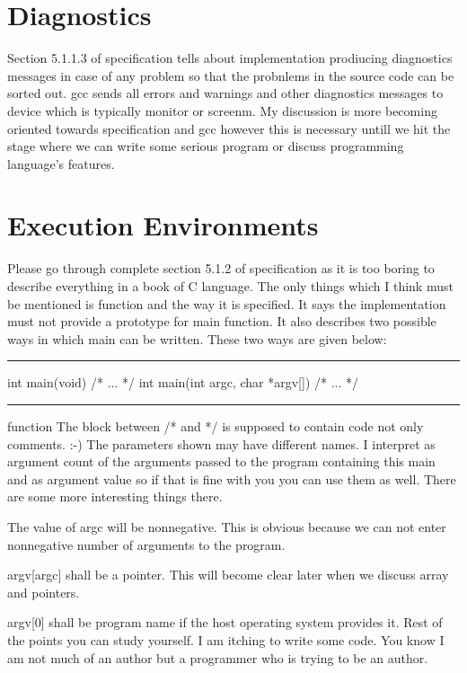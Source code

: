 \section{Diagnostics}
Section 5.1.1.3 of specification tells about implementation prodiucing
diagnostics messages in case of any problem so that the probnlems in
the source code can be sorted out. gcc sends all errors and warnings
and other diagnostics messages to  device which is
typically monitor or screenm. My discussion is more becoming oriented
towards specification and gcc however this is necessary untill we hit
the stage where we can write some serious program or discuss
programming language's features.

\section{Execution Environments}
Please go through complete section 5.1.2 of specification as it is too
boring to describe everything in a book of C language. The only things
which I think must be mentioned is  function and the way it
is specified. It says the implementation must not provide a prototype
for main function. It also describes two possible ways in which main
can be written. These two ways are given below:
\blank[force,1mm]\hrule\blank[force,1mm]
\startCPP
int main(void) { /* ... */ }
int main(int argc, char *argv[]) { /* ... */ }
\stopCPP
{}
\hrule
\blank[force,1mm]
\startalignment[middle]
 function
\stopalignment
The block between /* and */ is supposed to contain code not only
comments. :-) The parameters shown may have different names. I
interpret  as argument count of the arguments passed to the
program containing this main and  as argument
value so if that is fine with you you can use them as well. There are
some more interesting things there.
\startitemize[n]
\item The value of argc will be nonnegative. This is obvious because
  we can not enter nonnegative number of arguments to the program.
\item argv[argc] shall be a  pointer. This will become
  clear later when we discuss array and pointers.
\item argv[0] shall be program name if the host operating system
  provides it.
\stopitemize
Rest of the points you can study yourself. I am itching to write some
code. You know I am not much of an author but a programmer who is trying
to be an author.

